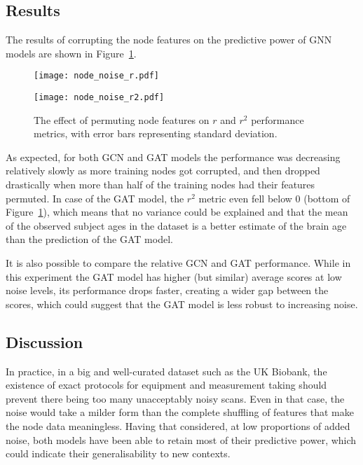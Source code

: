 \subsection{Results}

The results of corrupting the node features on the predictive power of GNN models are shown in Figure~\ref{figure:node-noise}.

\begin{figure}[h]
    \centering
    \texttt{[image: node\_noise\_r.pdf]}

    \texttt{[image: node\_noise\_r2.pdf]}
    \caption{The effect of permuting node features on $r$ and $r^2$ performance metrics, with error bars representing standard deviation.}\label{figure:node-noise}
\end{figure}

As expected, for both GCN and GAT models the performance was decreasing relatively slowly as more training nodes got corrupted, and then dropped drastically when more than half of the training nodes had their features permuted. In case of the GAT model, the $r^2$ metric even fell below 0 (bottom of Figure~\ref{figure:node-noise}), which means that no variance could be explained and that the mean of the observed subject ages in the dataset is a better estimate of the brain age than the prediction of the GAT model. 

It is also possible to compare the relative GCN and GAT performance. While in this experiment the GAT model has higher (but similar) average scores at low noise levels, its performance drops faster, creating a wider gap between the scores, which could suggest that the GAT model is less robust to increasing noise. 

\subsection{Discussion}
In practice, in a big and well-curated dataset such as the UK Biobank, the existence of exact protocols for equipment and measurement taking should prevent there being too many unacceptably noisy scans. Even in that case, the noise would take a milder form than the complete shuffling of features that make the node data meaningless. Having that considered, at low proportions of added noise, both models have been able to retain most of their predictive power, which could indicate their generalisability to new contexts.


